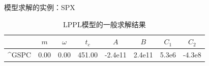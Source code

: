 \begin{frame}[t]{模型求解的实例：SPX}
    \begin{figure}[H]
    \end{figure}
    \begin{table}[H]
        \begin{tabular}{@{}lccccccc@{}}
        \toprule
                               & $m$  & $\omega$ & $t_c$  & $A$              & $B$             & $C_1$      & $C_2$         \\ \midrule
        \textasciicircum{}GSPC & 0.00 & 0.00     & 451.00 & -2.4e11 & 2.4e11 & 5.3e6 & -4.3e8 \\ \bottomrule
        \end{tabular}
        \caption{LPPL模型的一般求解结果}\label{T:Solution-3}
    \end{table}
\end{frame}
